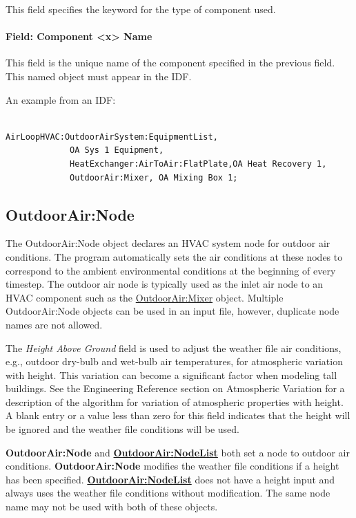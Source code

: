 This field specifies the keyword for the type of component used.

\paragraph{Field: Component \textless{}x\textgreater{} Name}\label{field-component-x-name}

This field is the unique name of the component specified in the previous field. This named object must appear in the IDF.

An example from an IDF:

\begin{lstlisting}

AirLoopHVAC:OutdoorAirSystem:EquipmentList,
             OA Sys 1 Equipment,
             HeatExchanger:AirToAir:FlatPlate,OA Heat Recovery 1,
             OutdoorAir:Mixer, OA Mixing Box 1;
\end{lstlisting}

\subsection{OutdoorAir:Node}\label{outdoorairnode}

The OutdoorAir:Node object declares an HVAC system node for outdoor air conditions. The program automatically sets the air conditions at these nodes to correspond to the ambient environmental conditions at the beginning of every timestep. The outdoor air node is typically used as the inlet air node to an HVAC component such as the \hyperref[outdoorairmixer]{OutdoorAir:Mixer} object. Multiple OutdoorAir:Node objects can be used in an input file, however, duplicate node names are not allowed.

The \emph{Height Above Ground} field is used to adjust the weather file air conditions, e.g., outdoor dry-bulb and wet-bulb air temperatures, for atmospheric variation with height. This variation can become a significant factor when modeling tall buildings. See the Engineering Reference section on Atmospheric Variation for a description of the algorithm for variation of atmospheric properties with height. A blank entry or a value less than zero for this field indicates that the height will be ignored and the weather file conditions will be used.

\textbf{OutdoorAir:Node} and \textbf{\hyperref[outdoorairnodelist]{OutdoorAir:\hyperref[nodelist]{NodeList}}} both set a node to outdoor air conditions. \textbf{OutdoorAir:Node} modifies the weather file conditions if a height has been specified. \textbf{\hyperref[outdoorairnodelist]{OutdoorAir:\hyperref[nodelist]{NodeList}}} does not have a height input and always uses the weather file conditions without modification. The same node name may not be used with both of these objects.

